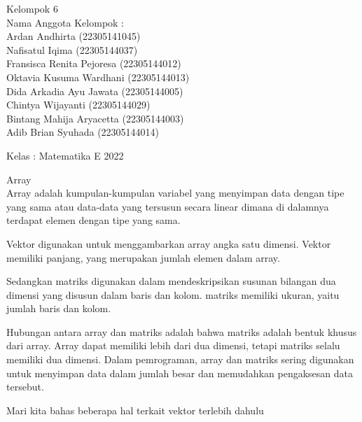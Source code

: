 \documentclass[a4paper,10pt]{article}
\begin{document}
\begin{eulernotebook}
\begin{eulercomment}
\begin{eulercomment}
\begin{eulercomment}
Kelompok 6\\
Nama Anggota Kelompok : \\
Ardan Andhirta (22305141045)\\
Nafisatul Iqima (22305144037)\\
Fransisca Renita Pejoresa (22305144012)\\
Oktavia Kusuma Wardhani (22305144013)\\
Dida Arkadia Ayu Jawata (22305144005)\\
Chintya Wijayanti (22305144029)\\
Bintang Mahija Aryacetta (22305144003)\\
Adib Brian Syuhada (22305144014)

Kelas : Matematika E 2022

\begin{eulercomment}
\begin{eulercomment}
Array\\
Array adalah kumpulan-kumpulan variabel yang menyimpan data dengan
tipe yang sama atau data-data yang tersusun secara linear dimana di
dalamnya terdapat elemen dengan tipe yang sama.

Vektor digunakan untuk menggambarkan array angka satu dimensi. Vektor
memiliki panjang, yang merupakan jumlah elemen dalam array.

Sedangkan matriks digunakan dalam mendeskripsikan susunan bilangan dua\\
dimensi yang disusun dalam baris dan kolom. matriks memiliki ukuran,
yaitu jumlah baris dan kolom.

Hubungan antara array dan matriks adalah bahwa matriks adalah bentuk
khusus dari array. Array dapat memiliki lebih dari dua dimensi, tetapi
matriks selalu memiliki dua dimensi. Dalam pemrograman, array dan
matriks sering digunakan untuk menyimpan data dalam jumlah besar dan
memudahkan pengaksesan data tersebut.

Mari kita bahas beberapa hal terkait vektor terlebih dahulu


\end{eulercomment}
\end{eulercomment}
\end{eulercomment}
\end{eulercomment}
\end{eulercomment}
\end{eulernotebook}
\end{document}
